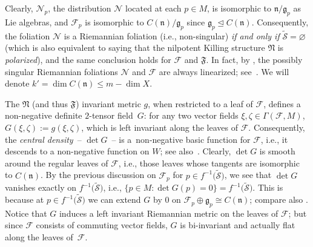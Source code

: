 \documentclass[pdftex]{sigma}
\numberwithin{equation}{section}
\begin{document}
Clearly, $\mathcal{N}_p$, the distribution $\mathcal{N}$ located at each $p\in
M$, is isomorphic to $\mathfrak{n}\slash \mathfrak{g}_p$ as Lie algebras, and
$\mathcal{F}_p$ is isomorphic to $C(\mathfrak{n})\slash \mathfrak{g}_p$ since
$\mathfrak{g}_p\trianglelefteq C(\mathfrak{n})$. Consequently, the foliation
$\mathcal{N}$ is a Riemannian foliation (i.e., non-singular) \emph{if and only
if} $\tilde{\mathcal{S}}=\varnothing$ (which is also equivalent to saying that the
nilpotent Killing structure $\mathfrak{N}$ is \emph{polarized}), and the same
conclusion holds for $\mathcal{F}$ and $\mathfrak{F}$. In fact, by
\cite[Theorem~0.5]{Fukaya88}, the possibly singular Riemannian foliations
$\mathcal{N}$ and $\mathcal{F}$ are always linearized; see~\cite{Molino88}. We
will denote $k'=\dim C(\mathfrak{n})\le m-\dim X$.

The $\mathfrak{N}$ (and thus $\mathfrak{F}$) invariant metric $g$, when
restricted to a leaf of $\mathcal{F}$, defines a non-negative definite
$2$-tensor field~$G$: for any two vector fields $\xi,\zeta \in
\Gamma(\mathcal{F},M)$, $G(\xi,\zeta):=g(\xi,\zeta)$, which is left
invariant along the leaves of $\mathcal{F}$. Consequently, the \emph{central
density}~-- $\det G$~-- is a~non-negative basic function for $\mathcal{F}$,
i.e., it descends to a non-negative function on $W$; see also~\cite{Foxy1908}.
Clearly, $\det G$ is smooth around the regular leaves of $\mathcal{F}$, i.e.,
those leaves whose tangents are isomorphic to $C(\mathfrak{n})$. By the
previous discussion on $\mathcal{F}_p$ for $p\in f^{-1}\big(\tilde{\mathcal{S}}\big)$,
we see that $\det G$ vanishes exactly on $f^{-1}\big(\tilde{\mathcal{S}}\big)$, i.e.,
$ \{p\in M\colon \det G(p)=0 \}=f^{-1}\big(\tilde{\mathcal{S}}\big)$. This is
because at $p\in f^{-1}\big(\tilde{\mathcal{S}}\big)$ we can extend $G$ by $0$ on
$\mathcal{F}_p\oplus \mathfrak{g}_p\cong C(\mathfrak{n})$; compare also
\cite[Theorem~0.6]{Fukaya87mGH}. Notice that $G$ induces a left invariant
Riemannian metric on the leaves of $\mathcal{F}$; but since $\mathcal{F}$
consists of commuting vector fields, $G$ is bi-invariant and actually flat
along the leaves of~$\mathcal{F}$.
\end{document}
